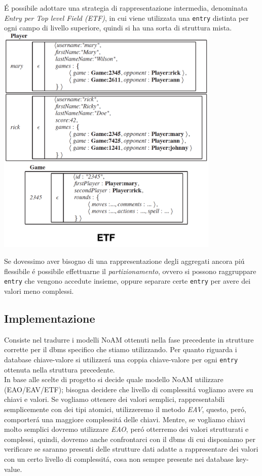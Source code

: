 É possibile adottare una strategia di rappresentazione intermedia, denominata \emph{Entry per Top level Field (ETF)}, in cui
viene utilizzata una \texttt{entry} distinta per ogni campo di livello superiore, quindi si ha una sorta di struttura mista.
\includegraphics[width=0.8\textwidth]{img/etf}

Se dovessimo aver bisogno di una rappresentazione degli aggregati ancora piú flessibile é possibile effettuarne il \emph{partizionamento},
ovvero si possono raggruppare \texttt{entry} che vengono accedute insieme, oppure separare certe \texttt{entry} per avere dei
valori meno complessi.

\subsection{Implementazione}
Consiste nel tradurre i modelli NoAM ottenuti nella fase precedente in strutture corrette per il dbms specifico che stiamo utilizzando.
Per quanto riguarda i database chiave-valore si utilizzerá una coppia chiave-valore per ogni \texttt{entry} ottenuta nella struttura
precedente.\\
In base alle scelte di progetto si decide quale modello NoAM utilizzare (EAO/EAV/ETF); bisogna decidere che livello di
complessitá vogliamo avere su chiavi e valori.
Se vogliamo ottenere dei valori semplici, rappresentabili semplicemente con dei tipi atomici, utilizzeremo il metodo \emph{EAV}, questo, peró, comporterá una maggiore complessitá delle chiavi.
Mentre, se vogliamo chiavi molto semplici dovremo utilizzare \emph{EAO}, peró otterremo dei valori strutturati e complessi, quindi, dovremo anche confrontarci con
il dbms di cui disponiamo per verificare se saranno presenti delle strutture dati adatte a rappresentare dei valori con un certo livello di complessitá, cosa non sempre
presente nei database key-value.\\

